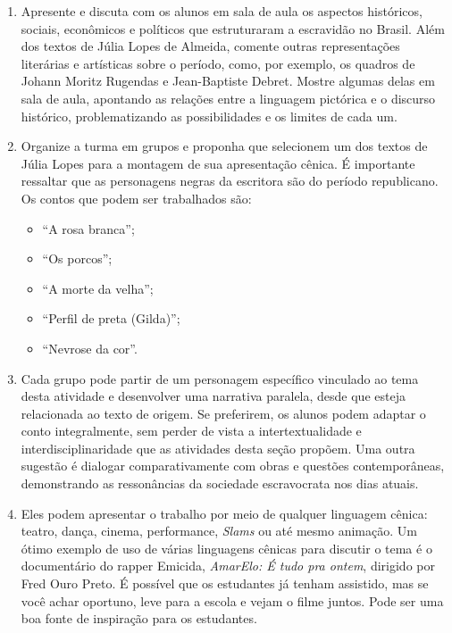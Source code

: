 \documentclass[12pt]{extarticle}
\begin{document}
\begin{enumerate}

\item
Apresente e discuta com os alunos em sala de
aula os aspectos históricos, sociais, econômicos e políticos que
estruturaram a escravidão no Brasil. Além dos textos de Júlia Lopes de
Almeida, comente outras representações literárias e artísticas sobre o
período, como, por exemplo, os quadros de Johann Moritz Rugendas e
Jean-Baptiste Debret. Mostre algumas delas em sala de aula, apontando as
relações entre a linguagem pictórica e o discurso histórico,
problematizando as possibilidades e os limites de cada um.






\item
Organize a turma em grupos e proponha que selecionem um dos textos de
Júlia Lopes para a montagem de sua apresentação cênica. É importante
ressaltar que as personagens negras da escritora são do período
republicano. Os contos que podem ser trabalhados são:

\begin{itemize}
\item
  ``A rosa branca'';
\item
  ``Os porcos'';
\item
  ``A morte da velha'';
\item
  ``Perfil de preta (Gilda)'';
\item
  ``Nevrose da cor''.
\end{itemize}

\item
Cada grupo pode partir de um personagem específico vinculado ao tema
desta atividade e desenvolver uma narrativa paralela, desde que esteja
relacionada ao texto de origem. Se preferirem, os alunos podem adaptar o
conto integralmente, sem perder de vista a
intertextualidade e interdisciplinaridade que as atividades desta seção
propõem. Uma outra sugestão é dialogar comparativamente com obras e
questões contemporâneas, demonstrando as ressonâncias da sociedade
escravocrata nos dias atuais.

\item
Eles podem apresentar o trabalho por meio de qualquer linguagem
cênica: teatro, dança, cinema, performance, \emph{Slams} ou até mesmo
animação. Um ótimo exemplo de uso de várias linguagens cênicas para
discutir o tema é o documentário do rapper Emicida, \emph{AmarElo: É
tudo pra ontem}, dirigido por Fred Ouro Preto. É possível que os
estudantes já tenham assistido, mas se você achar oportuno, leve para a
escola e vejam o filme juntos. Pode ser uma boa fonte de inspiração para
os estudantes.


\end{enumerate}
\end{document}
